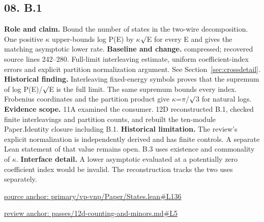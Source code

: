 \documentclass[11pt,letterpaper]{article}
\theoremstyle{definition}\newtheorem{definition}[theorem]{Definition}\newtheorem{example}[theorem]{Example}
\theoremstyle{remark}\newtheorem{remark}[theorem]{Remark}
\begin{document}
\subsection*{08. B.1}
\textbf{Role and claim.} Bound the number of states in the two-wire decomposition. One positive \ensuremath{\kappa} upper-bounds log P(E) by \ensuremath{\kappa}\ensuremath{\sqrt{\vphantom{x}}}E for every E and gives the matching asymptotic lower rate.
\textbf{Baseline and change.} compressed; recovered source lines 242--280. Full-limit interleaving estimate, uniform coefficient-index errors and explicit partition normalization argument. See Section~\ref{sec:crossdetail}.
\textbf{Historical finding.} Interleaving fixed-energy symbols proves that the supremum of log P(E)/\ensuremath{\sqrt{\vphantom{x}}}E is the full limit. The same supremum bounds every index. Frobenius coordinates and the partition product give \ensuremath{\kappa}=\ensuremath{\pi}/\ensuremath{\sqrt{\vphantom{x}}}3 for natural logs.
\textbf{Evidence scope.} 11A examined the consumer. 12D reconstructed B.1, checked finite interleavings and partition counts, and rebuilt the ten-module Paper.Identity closure including B.1.
\textbf{Historical limitation.} The review's explicit normalization is independently derived and has finite controls. A separate Lean statement of that value remains open. B.3 uses existence and commonality of \ensuremath{\kappa}.
\textbf{Interface detail.} A lower asymptotic evaluated at a potentially zero coefficient index would be invalid. The reconstruction tracks the two uses separately.
\par\href{https://github.com/nousentllc/VP-VNP-Review/blob/8a7976933b6b2b4ffda1ad3a0dfb5fc6b6f023e8/primary/vp-vnp/Paper/States.lean\#L136}{source anchor: primary/vp-vnp/Paper/States.lean\#L136}
\par\href{https://github.com/nousentllc/VP-VNP-Review/blob/8a7976933b6b2b4ffda1ad3a0dfb5fc6b6f023e8/passes/12d-counting-and-minors.md\#L5}{review anchor: passes/12d-counting-and-minors.md\#L5}
\goodbreak
\end{document}
